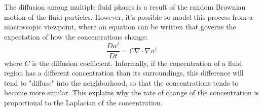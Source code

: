 The diffusion among multiple fluid phases is a result of the random Brownian motion of the fluid particles. However, it's possible to model this process from a macroscopic viewpoint, where an equation can be written that governs the expectation of how the concentrations change:
\begin{equation}
    \tag{Advection-Diffusion Equation}
    \frac{D \alpha^i}{D t} = C\nabla \cdot \nabla \alpha^i
\end{equation}
where $C$ is the diffusion coefficient. Informally, if the concentration of a fluid region has a different concentration than its surroundings, this difference will tend to "diffuse" into the neighborhood, so that the concentrations tends to become more similar. This explains why the rate of change of the concentration is proportional to the Laplacian of the concentration.

